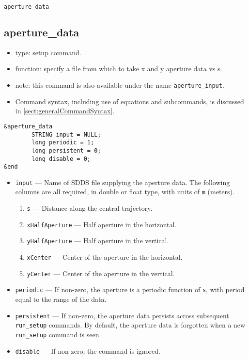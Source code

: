\documentclass[11pt]{article}
\begin{document}
\newpage
\begin{center}{\Large\verb|aperture_data|}\end{center}
\subsection{aperture\_data \label{subsec:aperturedata}}

\begin{itemize}
\item type: setup command.
\item function: specify a file from which to take x and y aperture data vs s.
\item note: this command is also available under the name \verb|aperture_input|.
\item Command syntax, including use of equations and subcommands, is discussed in \ref{sect:generalCommandSyntax}.
\end{itemize}

\begin{verbatim}
&aperture_data
        STRING input = NULL;
        long periodic = 1; 
        long persistent = 0;
        long disable = 0;
&end
\end{verbatim}

\begin{itemize}
\item \verb|input| --- Name of SDDS file supplying the aperture data.  The following columns are
  all required, in double or float type, with units of \verb|m| (meters).
  \begin{enumerate}
    \item \verb|s| --- Distance along the central trajectory.  
    \item \verb|xHalfAperture| --- Half aperture in the horizontal. 
    \item \verb|yHalfAperture| --- Half aperture in the vertical.
    \item \verb|xCenter| --- Center of the aperture in the horizontal.
    \item \verb|yCenter| --- Center of the aperture in the vertical.
  \end{enumerate}
\item \verb|periodic| --- If non-zero, the aperture is a periodic function of \verb|s|, with period equal
  to the range of the data.
\item \verb|persistent| --- If non-zero, the aperture data persists across subsequent \verb|run_setup| commands.
  By default, the aperture data is forgotten when a new \verb|run_setup| command is seen.
\item \verb|disable| --- If non-zero, the command is ignored.
\end{itemize}
\end{document}
